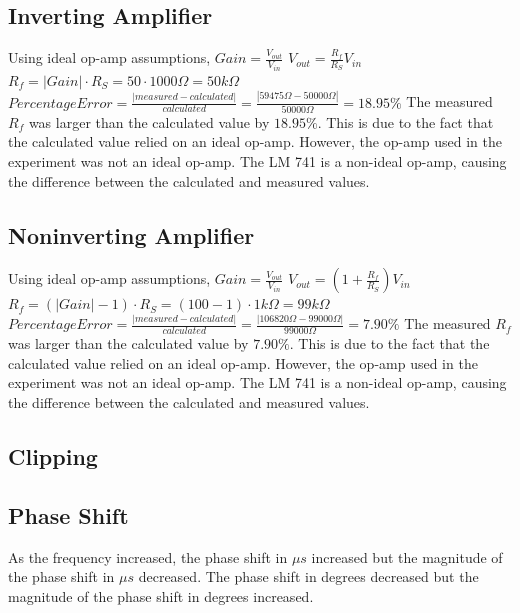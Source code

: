 \documentclass[10pt]{article}
\begin{document}
\subsection*{Inverting Amplifier}
\noindent Using ideal op-amp assumptions,
$Gain = \frac{V_{out}}{V_{in}}$
$V_{out} = \frac{R_f}{R_{S}}V_{in}$
$R_f = |Gain| \cdot R_{S} = 50 \cdot 1000\Omega = 50k\Omega$
$Percentage Error = \frac{|measured-calculated|}{calculated} = \frac{|59475\Omega-50000\Omega|}{50000\Omega} = 18.95\%$
\noindent The measured $R_f$ was larger than the calculated value by $18.95\%$. This is due to the fact that the calculated value relied on an ideal op-amp. However, the op-amp used in the experiment was not an ideal op-amp. The LM 741 is a non-ideal op-amp, causing the difference between the calculated and measured values.

\subsection*{Noninverting Amplifier}
\noindent Using ideal op-amp assumptions,
$Gain = \frac{V_{out}}{V_{in}}$
$V_{out} = (1+\frac{R_f}{R_{S}})V_{in}$
$R_f = (|Gain|-1)\cdot R_{S} = (100-1)\cdot 1k\Omega = 99k\Omega$
$Percentage Error = \frac{|measured-calculated|}{calculated} = \frac{|106820\Omega-99000\Omega|}{99000\Omega} = 7.90\%$
\noindent The measured $R_f$ was larger than the calculated value by $7.90\%$. This is due to the fact that the calculated value relied on an ideal op-amp. However, the op-amp used in the experiment was not an ideal op-amp. The LM 741 is a non-ideal op-amp, causing the difference between the calculated and measured values.

\subsection*{Clipping}

\subsection*{Phase Shift}
\noindent As the frequency increased, the phase shift in $\mu s$ increased but the magnitude of the phase shift in $\mu s$ decreased. The phase shift in degrees decreased but the magnitude of the phase shift in degrees increased. 
\end{document}
